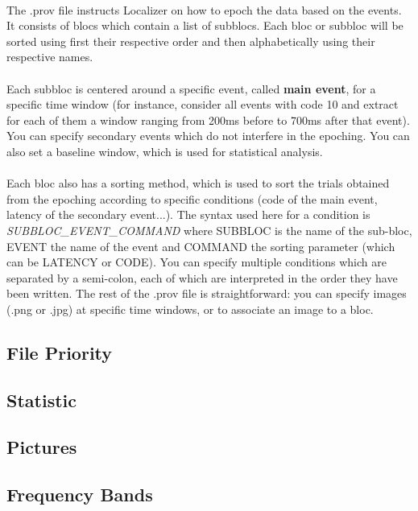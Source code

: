 \documentclass[a4paper]{article}
\begin{document}
\paragraph{} The .prov file instructs Localizer on how to epoch the data based on the events. It consists of blocs which contain a list of subblocs. Each bloc or subbloc will be sorted using first their respective order and then alphabetically using their respective names.
\paragraph{} Each subbloc is centered around a specific event, called \textbf{main event}, for a specific time window (for instance, consider all events with code 10 and extract for each of them a window ranging from 200ms before to 700ms after that event). You can specify secondary events which do not interfere in the epoching. You can also set a baseline window, which is used for statistical analysis.
\paragraph{} Each bloc also has a sorting method, which is used to sort the trials obtained from the epoching according to specific conditions (code of the main event, latency of the secondary event...). The syntax used here for a condition is \textit{SUBBLOC{\_}EVENT{\_}COMMAND} where SUBBLOC is the name of the sub-bloc, EVENT the name of the event and COMMAND the sorting parameter (which can be LATENCY or CODE). You can specify multiple conditions which are separated by a semi-colon, each of which are interpreted in the order they have been written. The rest of the .prov file is straightforward: you can specify images (.png or .jpg) at specific time windows, or to associate an image to a bloc. 
\subsection{File Priority}
\subsection{Statistic}
\subsection{Pictures}
\subsection{Frequency Bands}
\end{document}
